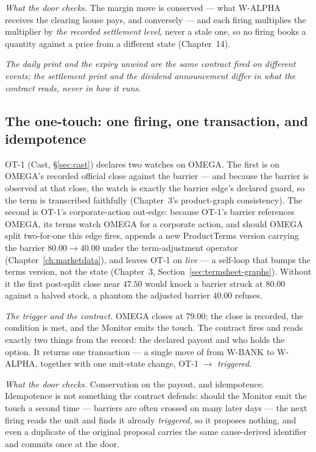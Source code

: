 \emph{What the door checks.} The margin move is conserved --- what W-ALPHA
receives the clearing house pays, and conversely --- and each firing multiplies
the multiplier by \emph{the recorded settlement level}, never a stale one, so no
firing books a quantity against a price from a different state (Chapter~14).

\emph{The daily print and the expiry unwind are the same contract fired on
different events; the settlement print and the dividend announcement differ in
what the contract reads, never in how it runs.}

\subsection{The one-touch: one firing, one transaction, and idempotence}

OT-1 (Cast, \S\ref{sec:cast}) declares two watches on OMEGA. The first is on
OMEGA's recorded official close against the barrier --- and because the barrier is observed at that close,
the watch is exactly the barrier edge's declared guard, so the term is
transcribed faithfully (Chapter~3's product-graph consistency). The second is
OT-1's corporate-action out-edge: because OT-1's barrier references OMEGA, its
terms watch OMEGA for a corporate action, and should OMEGA split two-for-one this
edge fires, appends a new ProductTerms version carrying the barrier
$80.00 \rightarrow 40.00$ under the term-adjustment operator
(Chapter~\ref{ch:marketdata}), and leaves OT-1 on \emph{live} --- a self-loop that
bumps the terms version, not the state (Chapter~3,
Section~\ref{sec:termsheet-graphs}). Without it the first post-split close near
$47.50$ would knock a barrier struck at $80.00$ against a halved stock, a phantom
the adjusted barrier $40.00$ refuses.

\emph{The trigger and the contract.} OMEGA closes at 79.00; the close is
recorded, the condition is met, and the Monitor emits the touch. The contract
fires and reads exactly two things from the record: the declared payout and who
holds the option. It returns one transaction --- a single move of
 from W-BANK to W-ALPHA, together with one unit-state change,
OT-1 $\rightarrow$ \emph{triggered}.

\emph{What the door checks.} Conservation on the payout, and idempotence.
Idempotence is not something the contract defends: should the Monitor emit the
touch a second time --- barriers are often crossed on many later days --- the
next firing reads the unit and finds it already \emph{triggered}, so it proposes
nothing, and even a duplicate of the original proposal carries the same
cause-derived identifier and commits once at the door.

